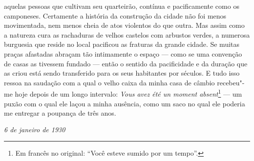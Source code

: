 aquelas pessoas que cultivam seu quarteirão, contínua e pacificamente
como os camponeses. Certamente a história da construção da cidade não
foi menos movimentada, nem menos cheia de atos violentos do que outra.
Mas assim como a natureza cura as rachaduras de velhos castelos com
arbustos verdes, a numerosa burguesia que reside no local pacificou as
fraturas da grande cidade. Se muitas praças afastadas abraçam tão
intimamente o espaço --- como se uma convenção de casas as tivessem
fundado --- então o sentido da pacificidade e da duração que as criou
está sendo transferido para os seus habitantes por séculos. E tudo isso
ressoa na saudação com a qual o velho caixa da minha casa de câmbio
recebeu"-me hoje depois de um longo intervalo: \emph{Vous avez été un
moment absent}\footnote{Em francês no original: ``Você esteve sumido por um tempo''. \versal{[N.~T.]}} --- um puxão com o qual ele laçou a minha
ausência, como um saco no qual ele poderia me entregar a poupança de
três anos.

\begin{flushright}
\emph{6 de janeiro de 1930}
\end{flushright}

